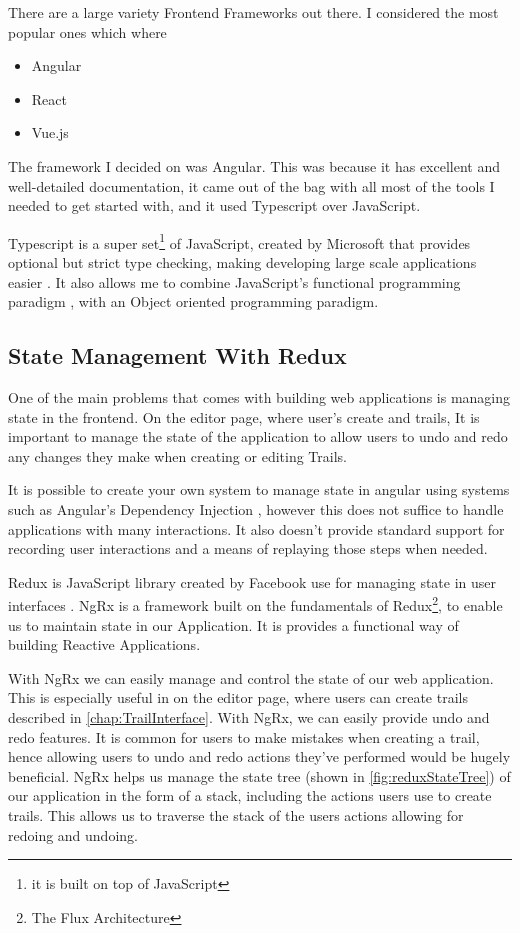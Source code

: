 There are a large variety Frontend Frameworks out there. I considered the most popular ones which where
\begin{itemize}
    \item Angular \cite{angular}
    \item React \cite{react}
    \item Vue.js \cite{vuejs}
\end{itemize}

The framework I decided on was Angular. This was because it has excellent and well-detailed documentation, it came out of the bag with all most of the tools I needed to get started with, and it used Typescript over JavaScript.

Typescript  is a super set\footnote{it is built on top of JavaScript} of JavaScript, created by Microsoft that provides optional but strict type checking, making developing large scale applications easier \cite{bierman2014understanding}. It also allows me to combine JavaScript's functional programming paradigm \cite{hughes1989functional}, with an Object oriented programming paradigm.

\subsection{State Management With Redux}
One of the main problems that comes with building web applications is managing state in the frontend. On the editor page, where user's create and trails, It is important to manage the state of the application to allow users to undo and redo any changes they make when creating or editing Trails.

It is possible to create your own system to manage state in angular using systems such as Angular's Dependency Injection \cite{wiki:DependencyInjection}, however this does not suffice to handle applications with many interactions. It also doesn't provide standard support for recording user interactions and a means of replaying those steps when needed.

Redux is JavaScript library created by Facebook use for managing state in user interfaces \cite{wiki:Redux}. NgRx \cite{cheng2018state} is a framework built on the fundamentals of Redux\footnote{The Flux Architecture}, to enable us to maintain state in our Application. It is provides a functional way of building Reactive Applications.

With NgRx we can easily manage and control the state of our web application. This is especially useful in on the editor page, where users can create trails described in \autoref{chap:TrailInterface}. With NgRx, we can easily provide undo and redo features. It is common for users to make mistakes when creating a trail, hence allowing users to undo and redo actions they've performed would be hugely beneficial. NgRx helps us manage the state tree (shown in \autoref{fig:reduxStateTree}) of our application in the form of a stack, including the actions users use to create trails. This allows us to traverse the stack of the users actions allowing for redoing and undoing.

